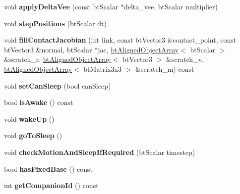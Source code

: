 \begin{DoxyCompactItemize}
void {\bfseries apply\+Delta\+Vee} (const bt\+Scalar $\ast$delta\+\_\+vee, bt\+Scalar multiplier)
\item 
\mbox{\label{classbtMultiBody_a81d5daf2fe75d4f21149f2607002fe23}} 
void {\bfseries step\+Positions} (bt\+Scalar dt)
\item 
\mbox{\label{classbtMultiBody_aab4d830259cb82acba18ef5f46c7ea81}} 
void {\bfseries fill\+Contact\+Jacobian} (int link, const bt\+Vector3 \&contact\+\_\+point, const bt\+Vector3 \&normal, bt\+Scalar $\ast$jac, \hyperlink{classbtAlignedObjectArray}{bt\+Aligned\+Object\+Array}$<$ bt\+Scalar $>$ \&scratch\+\_\+r, \hyperlink{classbtAlignedObjectArray}{bt\+Aligned\+Object\+Array}$<$ bt\+Vector3 $>$ \&scratch\+\_\+v, \hyperlink{classbtAlignedObjectArray}{bt\+Aligned\+Object\+Array}$<$ bt\+Matrix3x3 $>$ \&scratch\+\_\+m) const
\item 
\mbox{\label{classbtMultiBody_a2659acc78021df7907f0ac75e4e9ea61}} 
void {\bfseries set\+Can\+Sleep} (bool can\+Sleep)
\item 
\mbox{\label{classbtMultiBody_a15433657756131aef4055dcd7618ea1e}} 
bool {\bfseries is\+Awake} () const
\item 
\mbox{\label{classbtMultiBody_a2cf38777cf487eafb13cdd5b56a0f530}} 
void {\bfseries wake\+Up} ()
\item 
\mbox{\label{classbtMultiBody_adc438609bb0c384950cfba1ee720200b}} 
void {\bfseries go\+To\+Sleep} ()
\item 
\mbox{\label{classbtMultiBody_a6fda2785db8302ce2e487cf55aff23d5}} 
void {\bfseries check\+Motion\+And\+Sleep\+If\+Required} (bt\+Scalar timestep)
\item 
\mbox{\label{classbtMultiBody_a9bb5d0e983f409d92cbe18238621a50a}} 
bool {\bfseries has\+Fixed\+Base} () const
\item 
\mbox{\label{classbtMultiBody_a2c614edf28ebaa080560f1e8061d3b79}} 
int {\bfseries get\+Companion\+Id} () const
\item 
\mbox{\label{classbtMultiBody_aec0ff1d617e7d31344ad4f4c83e808e7}} 

\end{DoxyCompactItemize}
